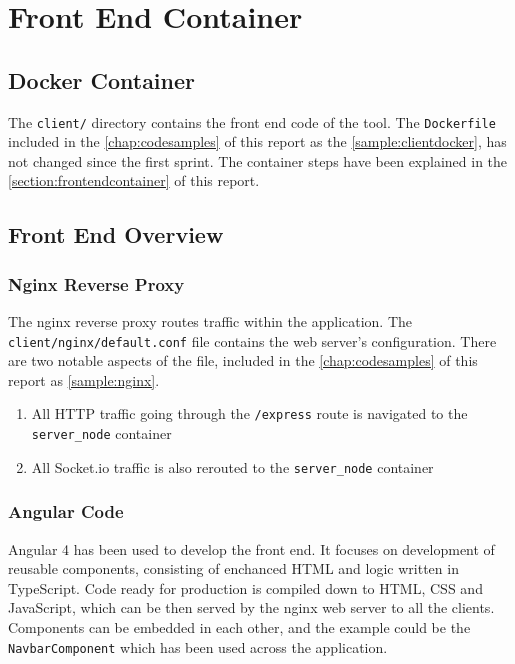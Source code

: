 \section{Front End Container}
\subsection{Docker Container}
The \texttt{client/} directory contains the front end code of the tool. The \texttt{Dockerfile}
included in the \autoref{chap:codesamples} of this report as the \autoref{sample:clientdocker},
has not changed since the first sprint. The container steps have been explained
in the \autoref{section:frontendcontainer} of this report.

\subsection{Front End Overview}
\subsubsection{Nginx Reverse Proxy}
The nginx reverse proxy routes traffic within the application. The \texttt{client/nginx/default.conf}
file contains the web server's configuration. There are two notable aspects of the file, included
in the \autoref{chap:codesamples} of this report as \autoref{sample:nginx}.

\begin{enumerate}
  \item All HTTP traffic going through the \texttt{/express} route is navigated to the \texttt{server\_node}
    container
  \item All Socket.io traffic is also rerouted to the \texttt{server\_node} container
\end{enumerate}

\subsubsection{Angular Code}
Angular 4 has been used to develop the front end. It focuses on development of reusable
components, consisting of enchanced HTML and logic written in TypeScript. Code ready for
production is compiled down to HTML, CSS and JavaScript, which can be then served by
the nginx web server to all the clients. Components can
be embedded in each other, and the example could be the \texttt{NavbarComponent} which has
been used across the application.

